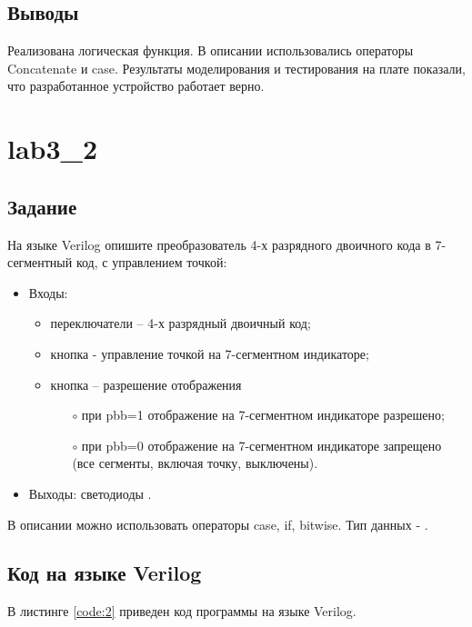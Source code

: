 \subsection{Выводы}

Реализована логическая функция. В описании использовались операторы Concatenate и case. Результаты моделирования и тестирования на плате показали, что разработанное устройство работает верно.

\section{lab3\_2}

\subsection{Задание}

На языке Verilog опишите преобразователь 4-х разрядного двоичного кода в 7-сегментный код, с управлением точкой:
\begin{itemize}
	\item Входы:
		\begin{itemize}
			\item переключатели  -- 4-х разрядный двоичный код;
			\item кнопка  - управление точкой на 7-сегментном индикаторе;
			\item кнопка  – разрешение отображения
				\begin{itemize}
					\item[$\circ$] при pbb=1 отображение на 7-сегментном индикаторе разрешено;
					\item[$\circ$] при pbb=0 отображение на 7-сегментном индикаторе запрещено (все сегменты, включая точку, выключены).
				\end{itemize}
		\end{itemize}		
	\item Выходы: светодиоды .
\end{itemize}

В описании можно использовать операторы case, if, bitwise. Тип данных - .

\subsection{Код на языке Verilog}

В листинге \ref{code:2} приведен код программы на языке Verilog.

%

